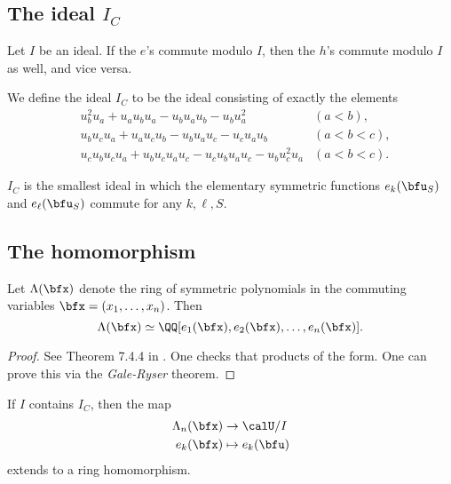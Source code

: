 \documentclass{article}
\begin{document}
\subsection{
    The ideal \texorpdfstring{$I_C$}{I\_C}
}

\begin{lemma}
    Let $I$ be an ideal.
    If the $e$'s commute modulo $I$, then the $h$'s commute modulo $I$ as well, and vice versa.
\end{lemma}

\begin{definition}
    We define the ideal $I_C$ to be the ideal consisting of exactly the elements
    \begin{align}
        &
        u_b^2u_a + u_au_bu_a - u_bu_au_b - u_bu_a^2 
        &
        (a<b),
        \\
        &
        u_bu_cu_a + u_au_cu_b - u_bu_au_c - u_cu_au_b
        &
        (a<b<c),
        \\
        &
        u_cu_bu_cu_a + u_bu_cu_au_c - u_cu_bu_au_c - u_bu_c^2u_a
        &
        (a<b<c).
    \end{align}
\end{definition}

\begin{theorem}
    \label{thm:ICImpliesEsCommute}
    $I_C$ is the smallest ideal in which the elementary symmetric functions $e_k(\bfu_S)$ and $e_\ell(\bfu_S)$ commute for any $k,\ell,S$.
\end{theorem}

\subsection{
    The homomorphism
}

\begin{theorem}
    \label{thm:FundThmSymFuncs}
    Let $\Lambda(\bfx)$ denote the ring of symmetric polynomials in the commuting variables $\bfx = (x_1,\ldots,x_n)$.
    Then
    \[
        \Lambda(\bfx)
        \simeq
        \QQ[e_1(\bfx), e_2(\bfx), \ldots, e_n(\bfx)].
    \]
\end{theorem}

\begin{proof}
    See Theorem 7.4.4 in \cite{EC2}.
    One checks that products of the form.
    One can prove this via the \textit{Gale-Ryser} theorem.
\end{proof}

\begin{corollary}
    If $I$ contains $I_C$, then the map
    \begin{align*}
        \Lambda_n(\bfx)
        &\to
        \calU/I
        \\
        e_k(\bfx)
        &\mapsto
        e_k(\bfu)
    \end{align*}
    extends to a ring homomorphism.
\end{corollary}
\end{document}
